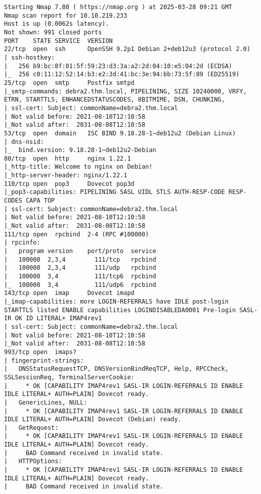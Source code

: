 \documentclass[11pt]{article}  %
\newenvironment{commandbox}[1][]{
    \begin{tcolorbox}[
        colback=kalibackground,   
        colframe=commandcolor,    
        fonttitle=\bfseries\color{white},  
        title=#1,               
        breakable=true           
    ]
}{
    \end{tcolorbox}
}
\begin{document}
\begin{commandbox}[Aggressive Scan]
\begin{lstlisting}[basicstyle=\normalsize\ttfamily\color{kalitext}]
Starting Nmap 7.80 ( https://nmap.org ) at 2025-03-28 09:21 GMT
Nmap scan report for 10.10.219.233
Host is up (0.0062s latency).
Not shown: 991 closed ports
PORT    STATE SERVICE  VERSION
22/tcp  open  ssh      OpenSSH 9.2p1 Debian 2+deb12u3 (protocol 2.0)
| ssh-hostkey: 
|   256 b9:bc:8f:01:5f:59:23:d3:3a:a2:2d:04:10:e5:04:2d (ECDSA)
|_  256 c0:11:12:52:14:b3:e2:3d:41:bc:3e:94:bb:73:5f:89 (ED25519)
25/tcp  open  smtp     Postfix smtpd
|_smtp-commands: debra2.thm.local, PIPELINING, SIZE 10240000, VRFY, ETRN, STARTTLS, ENHANCEDSTATUSCODES, 8BITMIME, DSN, CHUNKING, 
| ssl-cert: Subject: commonName=debra2.thm.local
| Not valid before: 2021-08-10T12:10:58
|_Not valid after:  2031-08-08T12:10:58
53/tcp  open  domain   ISC BIND 9.18.28-1~deb12u2 (Debian Linux)
| dns-nsid: 
|_  bind.version: 9.18.28-1~deb12u2-Debian
80/tcp  open  http     nginx 1.22.1
|_http-title: Welcome to nginx on Debian!
|_http-server-header: nginx/1.22.1
110/tcp open  pop3     Dovecot pop3d
|_pop3-capabilities: PIPELINING SASL UIDL STLS AUTH-RESP-CODE RESP-CODES CAPA TOP
| ssl-cert: Subject: commonName=debra2.thm.local
| Not valid before: 2021-08-10T12:10:58
|_Not valid after:  2031-08-08T12:10:58
111/tcp open  rpcbind  2-4 (RPC #100000)
| rpcinfo: 
|   program version    port/proto  service
|   100000  2,3,4        111/tcp   rpcbind
|   100000  2,3,4        111/udp   rpcbind
|   100000  3,4          111/tcp6  rpcbind
|_  100000  3,4          111/udp6  rpcbind
143/tcp open  imap     Dovecot imapd
|_imap-capabilities: more LOGIN-REFERRALS have IDLE post-login STARTTLS listed ENABLE capabilities LOGINDISABLEDA0001 Pre-login SASL-IR OK ID LITERAL+ IMAP4rev1
| ssl-cert: Subject: commonName=debra2.thm.local
| Not valid before: 2021-08-10T12:10:58
|_Not valid after:  2031-08-08T12:10:58
993/tcp open  imaps?
| fingerprint-strings: 
|   DNSStatusRequestTCP, DNSVersionBindReqTCP, Help, RPCCheck, SSLSessionReq, TerminalServerCookie: 
|     * OK [CAPABILITY IMAP4rev1 SASL-IR LOGIN-REFERRALS ID ENABLE IDLE LITERAL+ AUTH=PLAIN] Dovecot ready.
|   GenericLines, NULL: 
|     * OK [CAPABILITY IMAP4rev1 SASL-IR LOGIN-REFERRALS ID ENABLE IDLE LITERAL+ AUTH=PLAIN] Dovecot (Debian) ready.
|   GetRequest: 
|     * OK [CAPABILITY IMAP4rev1 SASL-IR LOGIN-REFERRALS ID ENABLE IDLE LITERAL+ AUTH=PLAIN] Dovecot ready.
|     BAD Command received in invalid state.
|   HTTPOptions: 
|     * OK [CAPABILITY IMAP4rev1 SASL-IR LOGIN-REFERRALS ID ENABLE IDLE LITERAL+ AUTH=PLAIN] Dovecot ready.
|     BAD Command received in invalid state.

\end{lstlisting}
\end{commandbox}
\end{document}
